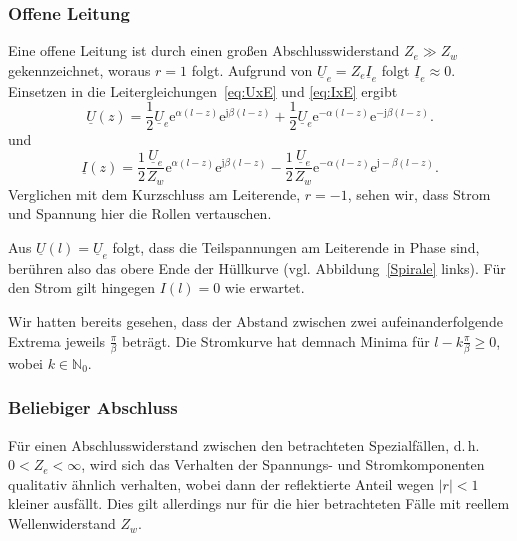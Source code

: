\documentclass[paper=a4, parskip=half-, ngerman, fontsize=11pt]{scrreprt}
\begin{document}
\subsubsection{Offene Leitung}
Eine offene Leitung ist durch einen großen Abschlusswiderstand $Z_{e} \gg Z_{w}$ gekennzeichnet, woraus $r=1$ folgt.
Aufgrund von $\underline{U}_{e} = Z_{e} \underline{I}_{e}$ folgt $\underline{I}_{e} \approx 0$. Einsetzen in die
Leitergleichungen~\eqref{eq:UxE} und \eqref{eq:IxE} ergibt
\begin{equation*}
\underline{U}(z) =
\frac{1}{2} \underline{U}_{e} \mathrm{e}^{\alpha (l - z)} \mathrm{e}^{\mathrm{j} \beta (l - z)}
+
\frac{1}{2} \underline{U}_{e} \mathrm{e}^{- \alpha (l - z)} \mathrm{e}^{- \mathrm{j} \beta (l - z)}.
\end{equation*}
und
\begin{equation*}
\underline{I}(z) =
\frac{1}{2} \frac{\underline{U}_{e}}{Z_{w}} \mathrm{e}^{\alpha (l - z)} \mathrm{e}^{\mathrm{j} \beta (l - z)}
-
\frac{1}{2} \frac{\underline{U}_{e}}{Z_{w}} \mathrm{e}^{- \alpha (l - z)} \mathrm{e}^{\mathrm{j} -\beta (l - z)}.
\end{equation*}
Verglichen mit dem Kurzschluss am Leiterende, $r=-1$, sehen wir, dass Strom und Spannung hier die Rollen vertauschen.

Aus $\underline{U}(l) = \underline{U}_{e}$ folgt, dass die Teilspannungen am Leiterende in Phase sind, berühren also
das obere Ende der Hüllkurve (vgl. Abbildung~\ref{Spirale} links). Für den Strom gilt hingegen $I(l) = 0$ wie erwartet.

Wir hatten bereits gesehen, dass der Abstand zwischen zwei aufeinanderfolgende Extrema jeweils $\frac{\pi}{\beta}$
beträgt. Die Stromkurve hat demnach Minima für $l - k \frac{\pi}{\beta} \ge 0$, wobei $k \in \mathbb{N}_{0}$.



\subsubsection{Beliebiger Abschluss}
Für einen Abschlusswiderstand zwischen den betrachteten Spezialfällen, d.\,h. $0 < Z_{e} < \infty$, wird sich das
Verhalten der Spannungs- und Stromkomponenten qualitativ ähnlich verhalten, wobei dann der reflektierte Anteil wegen
$\left| r \right| < 1$ kleiner ausfällt. Dies gilt allerdings nur für die hier betrachteten Fälle mit reellem
Wellenwiderstand $Z_{w}$.
\end{document}
